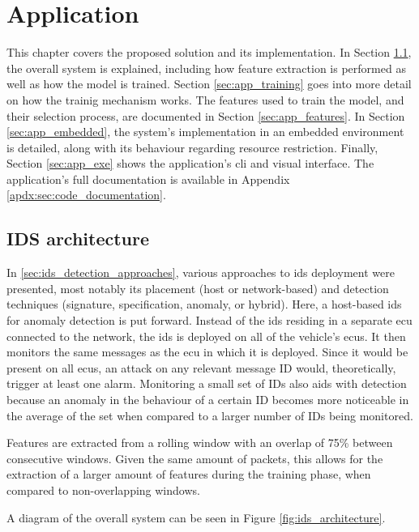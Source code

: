 \chapter{Application}
\label{c:application}

This chapter covers the proposed solution and its implementation. In Section \ref{sec:app_architecture}, the overall system is explained, including how feature extraction is performed as well as how the model is trained. Section \ref{sec:app_training} goes into more detail on how the trainig mechanism works. The features used to train the model, and their selection process, are documented in Section \ref{sec:app_features}. In Section \ref{sec:app_embedded}, the system's implementation in an embedded environment is detailed, along with its behaviour regarding resource restriction. Finally, Section \ref{sec:app_exe} shows the application's \gls{cli} and visual interface. The application's full documentation is available in Appendix \ref{apdx:sec:code_documentation}.

\section{IDS architecture}
\label{sec:app_architecture}

In \ref{sec:ids_detection_approaches}, various approaches to \gls{ids} deployment were presented, most notably its placement (host or network-based) and detection techniques (signature, specification, anomaly, or hybrid). Here, a host-based \gls{ids} for anomaly detection is put forward. Instead of the \gls{ids} residing in a separate \gls{ecu} connected to the network, the \gls{ids} is deployed on all of the vehicle's \glspl{ecu}. It then monitors the same messages as the \gls{ecu} in which it is deployed. Since it would be present on all \glspl{ecu}, an attack on any relevant message ID would, theoretically, trigger at least one alarm. Monitoring a small set of IDs also aids with detection because an anomaly in the behaviour of a certain ID becomes more noticeable in the average of the set when compared to a larger number of IDs being monitored.\par
Features are extracted from a rolling window with an overlap of 75\% between consecutive windows. Given the same amount of packets, this allows for the extraction of a larger amount of features during the training phase, when compared to non-overlapping windows.\par
A diagram of the overall system can be seen in Figure \ref{fig:ids_architecture}.

